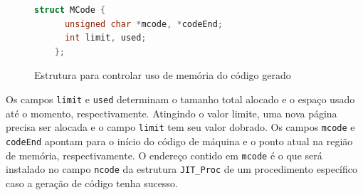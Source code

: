 \begin{figure}[h]
  \centering
  \begin{lstlisting}[language=C]
    struct MCode {
      unsigned char *mcode, *codeEnd;
      int limit, used;
    };
  \end{lstlisting}
  \caption{Estrutura para controlar uso de memória do código gerado\label{mcode-struct}}
\end{figure}

Os campos \verb!limit! e \verb!used! determinam o tamanho total
alocado e o espaço usado até o momento, respectivamente. Atingindo o
valor limite, uma nova página precisa ser alocada e o campo
\verb!limit! tem seu valor dobrado. Os campos \verb!mcode! e
\verb!codeEnd! apontam para o início do código de máquina e o
ponto atual na região de memória, respectivamente. O endereço contido em
\verb!mcode! é o que será instalado no campo
\verb!ncode! da estrutura \verb!JIT_Proc! de um procedimento
específico caso a geração de código tenha sucesso.




